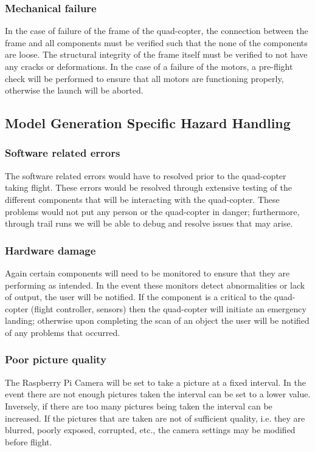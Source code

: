\documentclass[10pt,letterpaper]{article}
\begin{document}
\subsubsection{Mechanical failure}
In the case of failure of the frame of the quad-copter, the connection between the frame and all components must be verified such that the none of the components are loose. The structural integrity of the frame itself must be verified to not have any cracks or deformations. In the case of a failure of the motors, a pre-flight check will be performed to ensure that all motors are functioning properly, otherwise the launch will be aborted.

\subsection{Model Generation Specific Hazard Handling}
\subsubsection{Software related errors}
The software related errors would have to resolved prior to the quad-copter taking flight. These errors would be resolved through extensive testing of the different components that will be interacting with the quad-copter. These problems would not put any person or the quad-copter in danger; furthermore, through trail runs we will be able to debug and resolve issues that may arise.

\subsubsection{Hardware damage}
Again certain components will need to be monitored to ensure that they are performing as intended. In the event these monitors detect abnormalities or lack of output, the user will be notified. If the component is a critical to the quad-copter (flight controller, sensors) then the quad-copter will initiate an emergency landing; otherwise upon completing the scan of an object the user will be notified of any problems that occurred.

\subsubsection{Poor picture quality}
The Raspberry Pi Camera will be set to take a picture at a fixed interval. In the event there are not enough pictures taken the interval can be set to a lower value. Inversely, if there are too many pictures being taken the interval can be increased. If the pictures that are taken are not of sufficient quality, i.e. they are blurred, poorly exposed, corrupted, etc., the camera settings may be modified before flight.
\end{document}
